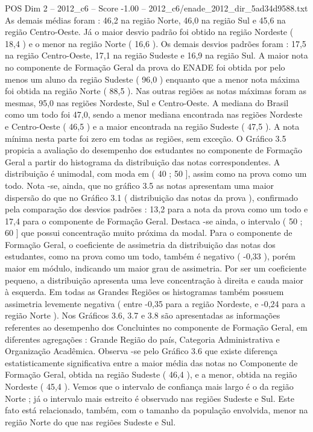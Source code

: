 \begin{textsample}{POS Dim 2 – 2012\_c6 – Score -1.00 – 2012\_c6/enade\_2012\_dir\_5ad34d9588.txt}
As demais médias foram : 46,2 na região Norte, 46,0 na região Sul e 45,6 na região Centro-Oeste.
Já o maior desvio padrão foi obtido na região Nordeste ( 18,4 ) e o menor na região Norte ( 16,6 ).
Os demais desvios padrões foram : 17,5 na região Centro-Oeste, 17,1 na região Sudeste e 16,9 na região Sul.
A maior nota no componente de Formação Geral da prova do ENADE foi obtida por pelo menos um aluno da região Sudeste ( 96,0 ) enquanto que a menor nota máxima foi obtida na região Norte ( 88,5 ).
Nas outras regiões as notas máximas foram as mesmas, 95,0 nas regiões Nordeste, Sul e Centro-Oeste.
A mediana do Brasil como um todo foi 47,0, sendo a menor mediana encontrada nas regiões Nordeste e Centro-Oeste ( 46,5 ) e a maior encontrada na região Sudeste ( 47,5 ).
A nota mínima nesta parte foi zero em todas as regiões, sem exceção.
O Gráfico 3.5 propicia a avaliação do desempenho dos estudantes no componente de Formação Geral a partir do histograma da distribuição das notas correspondentes.
A distribuição é unimodal, com moda em ( 40 ; 50 ], assim como na prova como um todo.
Nota -se, ainda, que no gráfico 3.5 as notas apresentam uma maior dispersão do que no Gráfico 3.1 ( distribuição das notas da prova ), confirmado pela comparação dos desvios padrões : 13,2 para a nota da prova como um todo e 17,4 para o componente de Formação Geral.
Destaca -se ainda, o intervalo ( 50 ; 60 ] que possui concentração muito próxima da modal.
Para o componente de Formação Geral, o coeficiente de assimetria da distribuição das notas dos estudantes, como na prova como um todo, também é negativo ( -0,33 ), porém maior em módulo, indicando um maior grau de assimetria.
Por ser um coeficiente pequeno, a distribuição apresenta uma leve concentração à direita e cauda maior à esquerda.
Em todas as Grandes Regiões os histogramas também possuem assimetria levemente negativa ( entre -0,35 para a região Nordeste, e -0,24 para a região Norte ).
Nos Gráficos 3.6, 3.7 e 3.8 são apresentadas as informações referentes ao desempenho dos Concluintes no componente de Formação Geral, em diferentes agregações : Grande Região do país, Categoria Administrativa e Organização Acadêmica.
Observa -se pelo Gráfico 3.6 que existe diferença estatisticamente significativa entre a maior média das notas no Componente de Formação Geral, obtida na região Sudeste ( 46,4 ), e a menor, obtida na região Nordeste ( 45,4 ).
Vemos que o intervalo de confiança mais largo é o da região Norte ; já o intervalo mais estreito é observado nas regiões Sudeste e Sul.
Este fato está relacionado, também, com o tamanho da população envolvida, menor na região Norte do que nas regiões Sudeste e Sul.

\end{textsample}
